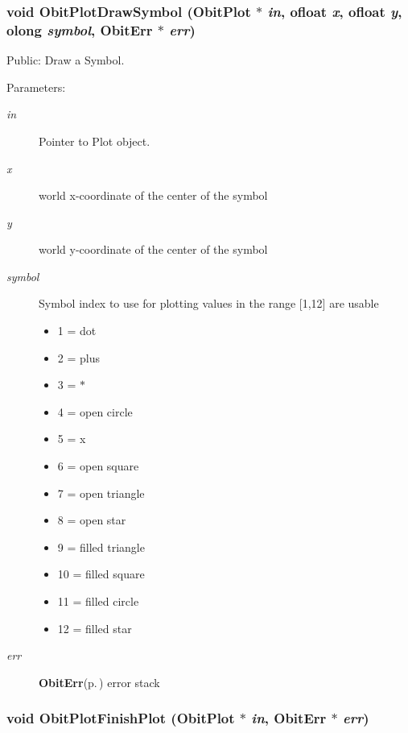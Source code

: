\subsubsection{\setlength{\rightskip}{0pt plus 5cm}void Obit\-Plot\-Draw\-Symbol ({\bf Obit\-Plot} $\ast$ {\em in}, {\bf ofloat} {\em x}, {\bf ofloat} {\em y}, {\bf olong} {\em symbol}, {\bf Obit\-Err} $\ast$ {\em err})}\label{ObitPlot_8c_a28}


Public: Draw a Symbol. 

\begin{Desc}
\item[Parameters:]
\begin{description}
\item[{\em in}]Pointer to Plot object. \item[{\em x}]world x-coordinate of the center of the symbol \item[{\em y}]world y-coordinate of the center of the symbol \item[{\em symbol}]Symbol index to use for plotting values in the range [1,12] are usable \begin{itemize}
\item 1 = dot \item 2 = plus \item 3 = $\ast$ \item 4 = open circle \item 5 = x \item 6 = open square \item 7 = open triangle \item 8 = open star \item 9 = filled triangle \item 10 = filled square \item 11 = filled circle \item 12 = filled star \end{itemize}
\item[{\em err}]{\bf Obit\-Err}{\rm (p.\,\pageref{structObitErr})} error stack \end{description}
\end{Desc}
\subsubsection{\setlength{\rightskip}{0pt plus 5cm}void Obit\-Plot\-Finish\-Plot ({\bf Obit\-Plot} $\ast$ {\em in}, {\bf Obit\-Err} $\ast$ {\em err})}\label{ObitPlot_8c_a16}


